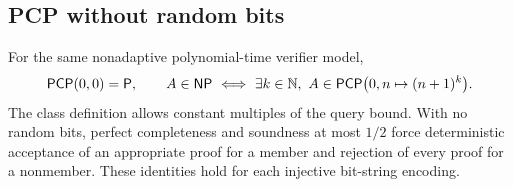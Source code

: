 \begin{result}
\subsection{PCP without random bits}
For the same nonadaptive polynomial-time verifier model,
\[
\cc{PCP}(0,0)=\cc P,\qquad
A\in\cc{NP}\ \Longleftrightarrow\
\exists k\in\mathbb N,\ A\in\cc{PCP}\bigl(0,n\mapsto(n+1)^k\bigr).
\]
The class definition allows constant multiples of the query bound. With no
random bits, perfect completeness and soundness at most $1/2$ force deterministic
acceptance of an appropriate proof for a member and rejection of every proof
for a nonmember. These identities hold for each injective bit-string encoding.
\citep[Chapter 11]{AroraBarak09}
\end{result}
